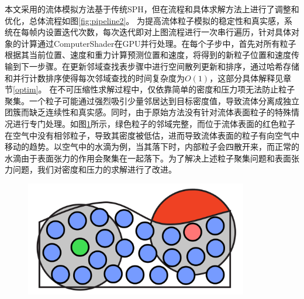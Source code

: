 本文采用的流体模拟方法基于传统SPH，但在流程和具体求解方法上进行了调整和优化，总体流程如图\ref{fig:pipeline2}。
为提高流体粒子模拟的稳定性和真实感，系统在每帧内设置迭代次数，每次迭代即对上图流程进行一次串行遍历，针对具体对象的计算通过ComputerShader在GPU并行处理。在每个子步中，首先对所有粒子根据其当前位置、速度和重力计算预测位置和速度，将得到的新粒子位置和速度传输到下一步骤。在更新邻域查找表步骤中进行空间散列更新和排序，通过哈希存储和并行计数排序使得每次邻域查找的时间复杂度为$O(1)$，这部分具体解释见章节\ref{optim}。
在不可压缩性求解过程中，仅依靠简单的密度和压力项无法防止粒子聚集。一个粒子可能通过强烈吸引少量邻居达到目标密度值，导致流体分离成独立团簇而缺乏连续性和真实感。同时，由于原始方法没有针对流体表面粒子的特殊情况进行专门处理。如图\ref{fig:surface}所示，绿色粒子的邻域完整，而位于流体表面的红色粒子在空气中没有相邻粒子，导致其密度被低估，进而导致流体表面的粒子有向空气中移动的趋势。以空气中的水滴为例，当其落下时，内部粒子会四散开来，而正常的水滴由于表面张力的作用会聚集在一起落下。为了解决上述粒子聚集问题和表面张力问题，我们对密度和压力的求解进行了改进。
\begin{figure}[ht]
 \centering
 \includegraphics[height=5cm]{image/bounder.png}
 \label{fig:surface}
\end{figure}

